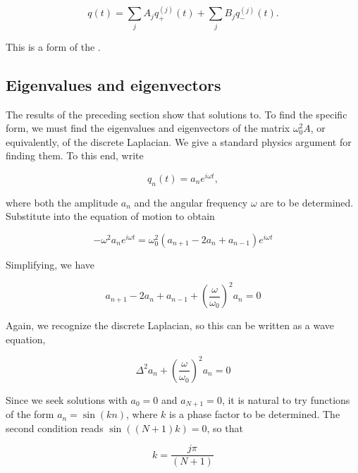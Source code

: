 \begin{equation}
q(t) = \sum_j A_j q^{(j)}_+(t)  +   \sum_j B_j q^{(j)}_-(t).
\end{equation}

This is a form of the .




\subsection{Eigenvalues and eigenvectors}

The results of the preceding section show that solutions to.  To find the specific form, we must find the eigenvalues and eigenvectors of the matrix $\omega_0^2A$, or equivalently, of the discrete Laplacian.  We give a standard physics argument for finding them.  To this end, write 

\begin{equation}
q_n(t) = a_n e^{i\omega t},
\end{equation}

where both the amplitude $a_n$ and the angular frequency $\omega$ are to be determined.  Substitute into the equation of motion to obtain

\begin{equation}
-\omega^2 a_n e^{i\omega t} 
= \omega_0^2( a_{n+1} - 2a_n + a_{n-1} ) e^{i\omega t}
\end{equation}

Simplifying, we have

\begin{equation}
\label{aneq}
a_{n+1} - 2a_n + a_{n-1} + \left(\frac{\omega}{\omega_0}\right)^2 a_n = 0
\end{equation}

Again, we recognize the discrete Laplacian, so this can be written as a wave equation,

\begin{equation}
\Delta^2 a_n + \left(\frac{\omega}{\omega_0}\right)^2 a_n = 0
\end{equation}

Since we seek solutions with $a_0 = 0$ and $a_{N+1} = 0$,
it is natural to try functions of the form $a_n = \sin(kn)$, where $k$ is a phase factor to be determined. The second condition reads $\sin((N+1)k) = 0$, so that 

\begin{equation}
\label{crystalphasefactor}
k = \frac{j\pi}{(N+1)}
\end{equation}

